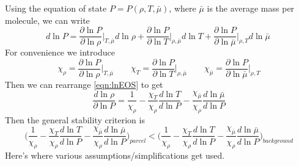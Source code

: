 Using the equation of state $P = P( \rho, T, \bar{\mu})$, where 
$\bar{\mu}$  is the average mass per molecule, we can write 
\begin{equation}
  d \ln P = \frac{\partial \ln P}{\partial \ln \rho} \bigg |_{T, \bar{\mu}}d \ln \rho + \frac{\partial \ln P}{\partial \ln T} \bigg |_{\rho, \bar{\mu}} d \ln T + \frac{\partial \ln P}{\partial \ln \bar{\mu}}\bigg |_{\rho, T} d \ln \bar{\mu}\
\label{eqn:lnEOS}
\end{equation}
For convenience we introduce 
\[
  \chi_{\rho} = \frac{\partial \ln P}{\partial \ln \rho}\bigg |_{T,\bar{\mu}} \qquad
  \chi_T = \frac{\partial \ln P}{\partial \ln T} \bigg |_{\rho,\bar{\mu}} \qquad
  \chi_{\bar{\mu}} = \frac{\partial \ln P}{\partial \ln \bar{\mu}} \bigg |_{\rho, T}
\]
Then we can rearrange \ref{eqn:lnEOS} to get
\begin{equation}
  \frac{d \ln \rho}{\partial \ln P} = \frac{1}{\chi_\rho} - 
  \frac{\chi_T}{\chi_\rho} \frac{d \ln T}{d \ln P}- \frac{\chi_{\bar{\mu}}}{\chi_\rho}
  \frac{d \ln \bar{\mu}}{d \ln P}
\end{equation}
%
Then the general stability criterion is
\begin{equation}
  \bigg ( \frac{1}{\chi_\rho} - 
  \frac{\chi_T}{\chi_\rho} \frac{d \ln T}{d \ln P}- \frac{\chi_{\bar{\mu}}}{\chi_\rho}
  \frac{d \ln \bar{\mu}}{d \ln P} \bigg )_{parcel} < 
  \bigg ( \frac{1}{\chi_\rho} - 
  \frac{\chi_T}{\chi_\rho} \frac{d \ln T}{d \ln P}- \frac{\chi_{\bar{\mu}}}{\chi_\rho}
  \frac{d \ln \bar{\mu}}{d \ln P} \bigg )_{background}
\label{eqn:genStability}
\end{equation}
%
Here's where various assumptions/simplifications get used.  
